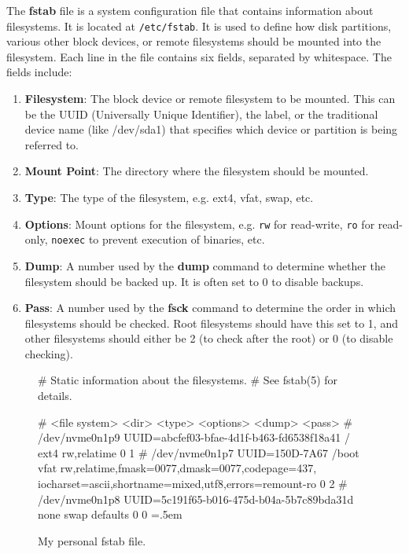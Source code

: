 \documentclass{article}
\newenvironment{cverbatim}
    {\SaveVerbatim{cverb}}
    {\endSaveVerbatim
    \flushleft\fboxrule=0pt\fboxsep=.5em
    \colorbox{cverbbg}{%
      \makebox[\dimexpr\linewidth-2\fboxsep][l]{\BUseVerbatim{cverb}}%
    }
    \endflushleft
  }
\begin{document}
    \begin{definition}[fstab]
      The \textbf{fstab} file is a system configuration file that contains information about filesystems. It is located at \texttt{/etc/fstab}. It is used to define how disk partitions, various other block devices, or remote filesystems should be mounted into the filesystem. 
      Each line in the file contains six fields, separated by whitespace. The fields include: 
      \begin{enumerate} 
        \item \textbf{Filesystem}: The block device or remote filesystem to be mounted. This can be the UUID (Universally Unique Identifier), the label, or the traditional device name (like /dev/sda1) that specifies which device or partition is being referred to.
        \item \textbf{Mount Point}: The directory where the filesystem should be mounted. 
        \item \textbf{Type}: The type of the filesystem, e.g. ext4, vfat, swap, etc.
        \item \textbf{Options}: Mount options for the filesystem, e.g. \texttt{rw} for read-write, \texttt{ro} for read-only, \texttt{noexec} to prevent execution of binaries, etc.
        \item \textbf{Dump}: A number used by the \textbf{dump} command to determine whether the filesystem should be backed up. It is often set to $0$ to disable backups. 
        \item \textbf{Pass}: A number used by the \textbf{fsck} command to determine the order in which filesystems should be checked. Root filesystems should have this set to 1, and other filesystems should either be 2 (to check after the root) or 0 (to disable checking). 
      \end{enumerate}
    \end{definition}
    \begin{figure}[hbt!]
      \centering 
      \begin{cverbatim} 
# Static information about the filesystems.
# See fstab(5) for details.

# <file system> <dir> <type> <options> <dump> <pass>
# /dev/nvme0n1p9
UUID=abcfef03-bfae-4d1f-b463-fd6538f18a41	/ ext4 rw,relatime 0 1
# /dev/nvme0n1p7
UUID=150D-7A67 /boot vfat rw,relatime,fmask=0077,dmask=0077,codepage=437,
    iocharset=ascii,shortname=mixed,utf8,errors=remount-ro	0 2
# /dev/nvme0n1p8
UUID=5c191f65-b016-475d-b04a-5b7c89bda31d	none swap defaults 0 0
      \end{cverbatim}
      \caption{My personal fstab file.} 
      \label{fig:fstab}
    \end{figure}
\end{document}
